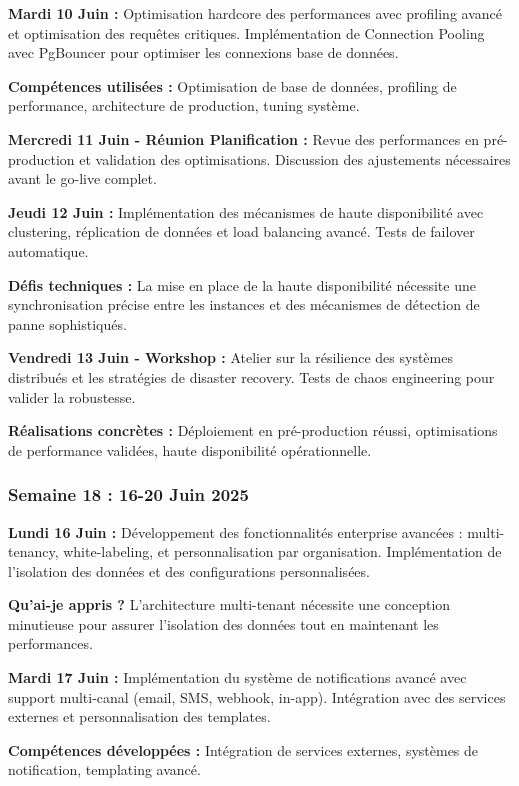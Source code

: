 \documentclass[a4paper,12pt]{article}
\begin{document}
\textbf{Mardi 10 Juin :}
Optimisation hardcore des performances avec profiling avancé et optimisation des requêtes critiques. Implémentation de Connection Pooling avec PgBouncer pour optimiser les connexions base de données.

\textbf{Compétences utilisées :} Optimisation de base de données, profiling de performance, architecture de production, tuning système.

\textbf{Mercredi 11 Juin - Réunion Planification :}
Revue des performances en pré-production et validation des optimisations. Discussion des ajustements nécessaires avant le go-live complet.

\textbf{Jeudi 12 Juin :}
Implémentation des mécanismes de haute disponibilité avec clustering, réplication de données et load balancing avancé. Tests de failover automatique.

\textbf{Défis techniques :} La mise en place de la haute disponibilité nécessite une synchronisation précise entre les instances et des mécanismes de détection de panne sophistiqués.

\textbf{Vendredi 13 Juin - Workshop :}
Atelier sur la résilience des systèmes distribués et les stratégies de disaster recovery. Tests de chaos engineering pour valider la robustesse.

\textbf{Réalisations concrètes :} Déploiement en pré-production réussi, optimisations de performance validées, haute disponibilité opérationnelle.

\subsubsection{Semaine 18 : 16-20 Juin 2025}

\textbf{Lundi 16 Juin :}
Développement des fonctionnalités enterprise avancées : multi-tenancy, white-labeling, et personnalisation par organisation. Implémentation de l'isolation des données et des configurations personnalisées.

\textbf{Qu'ai-je appris ?} L'architecture multi-tenant nécessite une conception minutieuse pour assurer l'isolation des données tout en maintenant les performances.

\textbf{Mardi 17 Juin :}
Implémentation du système de notifications avancé avec support multi-canal (email, SMS, webhook, in-app). Intégration avec des services externes et personnalisation des templates.

\textbf{Compétences développées :} Intégration de services externes, systèmes de notification, templating avancé.
\end{document}
